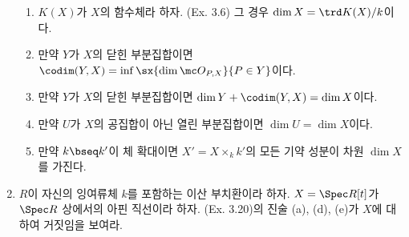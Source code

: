 \begin{enumerate}[label=\tb{3.\arabic*.},itemindent=0mm,itemsep=2mm]
\begin{enumerate}[label=(\alph*)]
	\item $K(X)$가 $X$의 함수체라 하자. (Ex. 3.6) 그 경우 $\dim X=\trd K(X)/k$이다.
	\item 만약 $Y$가 $X$의 닫힌 부분집합이면 $\codim(Y,X)=\inf\sx{\dim\mc O_{P,X}}{P\in Y}$이다.
	\item 만약 $Y$가 $X$의 닫힌 부분집합이면 $\dim Y+\codim(Y,X)=\dim X$이다.
	\item 만약 $U$가 $X$의 공집합이 아닌 열린 부분집합이면 $\dim U=\dim X$이다.
	\item 만약 $k\bseq k'$이 체 확대이면 $X'=X\times_kk'$의 모든 기약 성분이 차원 $\dim X$를 가진다.
	\end{enumerate}
	\item $R$이 자신의 잉여류체 $k$를 포함하는 이산 부치환이라 하자. $X=\Spec R[t]$가 $\Spec R$ 상에서의 아핀 직선이라 하자.
	(Ex. 3.20)의 진술 (a), (d), (e)가 $X$에 대하여 거짓임을 보여라.\\[-2.3mm]
	\end{enumerate}
